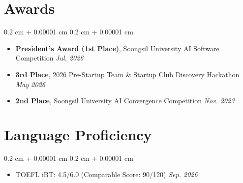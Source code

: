 \documentclass[10pt, letterpaper]{article}
\newenvironment{highlights}{
    \begin{itemize}[
        topsep=0.10 cm,
        parsep=0.10 cm,
        partopsep=0pt,
        itemsep=0pt,
        leftmargin=0.4 cm + 10pt
    ]
}{
    \end{itemize}
}
\newenvironment{onecolentry}{
    \begin{adjustwidth}{
        0.2 cm + 0.00001 cm
    }{
        0.2 cm + 0.00001 cm
    }
}{
    \end{adjustwidth}
}
\begin{document}
        \vspace{0.2 cm}


    \section{Awards}

        \begin{onecolentry}
            \begin{highlights}
                \item \textbf{President's Award (1st Place)},
                Soongsil University AI Software Competition
                \hfill
                \textit{Jul. 2026}

                \item \textbf{3rd Place},
                2026 Pre-Startup Team \& Startup Club Discovery Hackathon
                \hfill
                \textit{May 2026}

                \item \textbf{2nd Place},
                Soongsil University AI Convergence Competition
                \hfill
                \textit{Nov. 2023}
            \end{highlights}
        \end{onecolentry}


    \section{Language Proficiency}

        \begin{onecolentry}
            \begin{highlights}
                \item TOEFL iBT: 4.5/6.0 (Comparable Score: 90/120)
                \hfill
                \textit{Sep. 2026}
            \end{highlights}
        \end{onecolentry}
\end{document}

